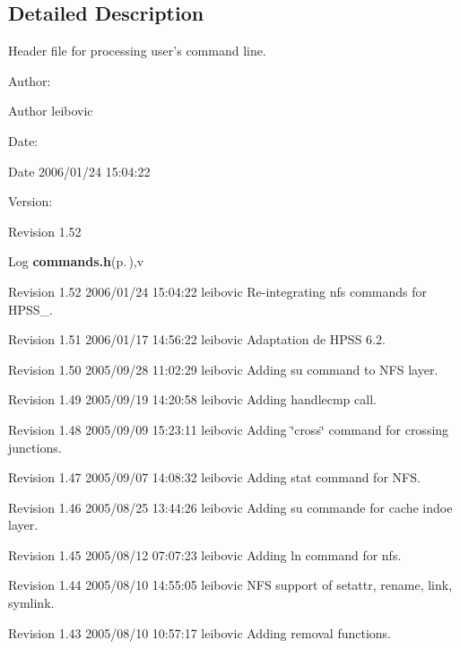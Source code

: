 \subsection{Detailed Description}
Header file for processing user's command line. 

\begin{Desc}
\item[Author:]\begin{Desc}
\item[Author]leibovic \end{Desc}
\end{Desc}
\begin{Desc}
\item[Date:]\begin{Desc}
\item[Date]2006/01/24 15:04:22 \end{Desc}
\end{Desc}
\begin{Desc}
\item[Version:]\begin{Desc}
\item[Revision]1.52 \end{Desc}
\end{Desc}
\begin{Desc}
\item[Log]{\bf commands.h}{\rm (p.\,\pageref{commands_8h})},v \end{Desc}
Revision 1.52 2006/01/24 15:04:22 leibovic Re-integrating nfs commands for HPSS\_.

Revision 1.51 2006/01/17 14:56:22 leibovic Adaptation de HPSS 6.2.

Revision 1.50 2005/09/28 11:02:29 leibovic Adding su command to NFS layer.

Revision 1.49 2005/09/19 14:20:58 leibovic Adding handlecmp call.

Revision 1.48 2005/09/09 15:23:11 leibovic Adding \char`\"{}cross\char`\"{} command for crossing junctions.

Revision 1.47 2005/09/07 14:08:32 leibovic Adding stat command for NFS.

Revision 1.46 2005/08/25 13:44:26 leibovic Adding su commande for cache indoe layer.

Revision 1.45 2005/08/12 07:07:23 leibovic Adding ln command for nfs.

Revision 1.44 2005/08/10 14:55:05 leibovic NFS support of setattr, rename, link, symlink.

Revision 1.43 2005/08/10 10:57:17 leibovic Adding removal functions.

